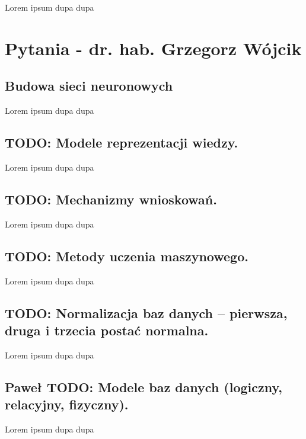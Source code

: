 \documentclass[a4paper,12pt,oneside]{book}
\begin{document}
		Lorem ipsum dupa dupa
		
		
	
	\chapter{Pytania - dr. hab. Grzegorz Wójcik}
		
		\setcounter{section}{32}
		\section{Budowa sieci neuronowych}
				
				Lorem ipsum dupa dupa
		
		\setcounter{section}{29}
		\section{\color{red} TODO: Modele reprezentacji wiedzy.}
				
				Lorem ipsum dupa dupa
		
		\setcounter{section}{30}
		\section{\color{red} TODO: Mechanizmy wnioskowań. }
				
				Lorem ipsum dupa dupa
		
		\setcounter{section}{31}
		\section{\color{red} TODO: Metody uczenia maszynowego.} 
				
				Lorem ipsum dupa dupa
		
		\setcounter{section}{33}
		\section{\color{red} TODO: Normalizacja baz danych – pierwsza, druga i trzecia postać normalna. }
				
				Lorem ipsum dupa dupa
		
		\setcounter{section}{34}
		\section{\color{green}Paweł \color{red} TODO: Modele baz danych (logiczny, relacyjny, fizyczny). }
				
				Lorem ipsum dupa dupa
		
		\setcounter{section}{35}
\end{document}
